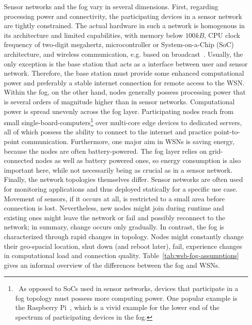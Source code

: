   Sensor networks and the fog vary in several dimensions. First, regarding processing power and connectivity, the participating de\-vi\-ces in a sensor network are tightly constrained. The actual hardware in such a network is homogenous in its architecture and limited capabilities, with memory below $100kB$, CPU clock frequency of two-digit megahertz, microcontroller or System-on-a-Chip (SoC) architecture, and wireless communication, e.g. based on broadcast~\cite{fahmy_part_2016-1}. Usually, the only exception is the base station that acts as a interface between user and sensor network. Therefore, the base station must provide some enhanced computational power and preferably a stable internet connection for remote access to the WSN. Within the fog, on the other hand, nodes generally possess processing power that is several orders of magnitude higher than in sensor networks. Computational power is spread unevenly across the fog layer. Participating nodes reach from small single-board-computers\footnote{~As opposed to SoCs used in sensor networks, devices that participate in a fog topology must possess more computing power. One popular example is the Raspberry Pi~\cite{noauthor_raspberry_nodate}, which is a vivid example for the lower end of the spectrum of participating devices in the fog.} over multi-core edge devices to dedicated servers, all of which possess the ability to connect to the internet and practice point-to-point communication. Furthermore, one major aim in WSNs is saving energy, because the nodes are often battery-powered. The fog layer relies on grid-connected nodes as well as battery powered ones, so energy consumption is also important here, while not necessarily being as crucial as in a sensor network. Finally, the network topologies themselves differ. Sensor networks are often used for monitoring applications and thus deployed statically for a specific use case. Movement of sensors, if it occurs at all, is restricted to a small area before connection is lost. Nevertheless, new nodes might join during runtime and existing ones might leave the network or fail and possibly reconnect to the network; in summary, change occurs only gradually. In contrast, the fog is characterized through rapid changes in topology. Nodes might constantly change their geo-spacial location, shut down (and reboot later), fail, experience changes in  computational load and connection quality. Table~\ref{tab:wsb-fog-assumptions} gives an informal overview of the differences between the fog and WSNs.
  
